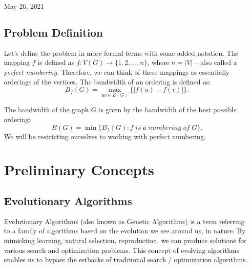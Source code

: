 \documentclass[conference,compsoc]{IEEEtran}
\begin{document}
\hfill May 26, 2021

\subsection{Problem Definition}
Let's define the problem in more formal terms with some added notation. 
The mapping $f$ is defined as $f: V(G) \to \{1, 2, \dots, n\}$, where $n = |V|$ -- also called a \emph{perfect numbering}. \cite{Lee2016} Therefore, 
we can think of these mappings as essentially orderings of the vertices. The bandwidth of an ordering is defined as:
\begin{equation}
B_f(G) = \max_{uv \in E(G)}\{|f(u) - f(v)|\}.
\end{equation}

The bandwidth of the graph $G$ is given by the bandwidth of the best possible ordering:
\begin{equation}
B(G) = \min\{B_f(G): f\; is\; a \;numbering\; of\; G\}.    
\end{equation}
We will be restricting ourselves to working with perfect numbering.

\section{Preliminary Concepts}
\subsection{Evolutionary Algorithms}
Evolutionary Algorithms (also known as Genetic Algorithms) is a term referring to a family of algorithms based on the evolution we see around us, in nature. By mimicking learning, natural selection, reproduction, we can produce solutions for various search and optimization problems. This concept of evolving algorithms enables us to bypass the setbacks of traditional search / optimization algorithms.
\end{document}
